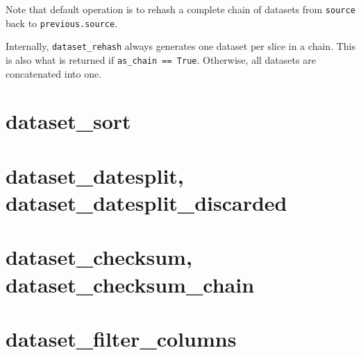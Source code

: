 \noindent Note that default operation is to rehash a complete chain of
datasets from \texttt{source} back to \texttt{previous.source}.

Internally, \texttt{dataset\_rehash} always generates one dataset per
slice in a chain.  This is also what is returned if \texttt{as\_chain
  == True}.  Otherwise, all datasets are concatenated into one.

\clearpage
\section{dataset\_sort}

\clearpage
\section{dataset\_datesplit, dataset\_datesplit\_discarded}

\clearpage
\section{dataset\_checksum, dataset\_checksum\_chain}

\clearpage
\section{dataset\_filter\_columns}

